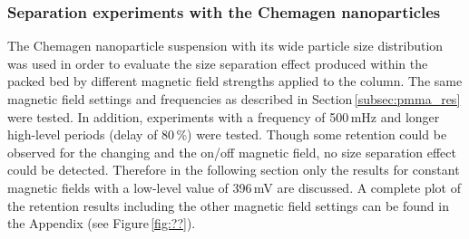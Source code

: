 \subsubsection{Separation experiments with the Chemagen nanoparticles}
\label{subsubsec:chemagen_res}
The Chemagen nanoparticle suspension with its wide particle size distribution was used in order to evaluate the size separation effect produced within the packed bed by different magnetic field strengths applied to the column. The same magnetic field settings and frequencies as described in Section\,\ref{subsec:pmma_res} were tested. In addition, experiments with a frequency of 500\,mHz and longer high-level periods (delay of 80\,\%) were tested. Though some retention could be observed for the changing and the on/off magnetic field, no size separation effect could be  detected. Therefore in the following section only the results for constant magnetic fields with a low-level value of 396\,mV are discussed. A complete plot of the retention results including the other magnetic field settings can be found in the Appendix (see Figure\,\ref{fig:??}).
   
